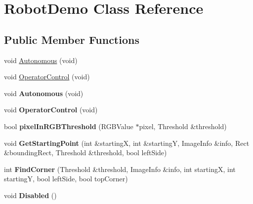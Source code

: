 \hypertarget{class_robot_demo}{\section{Robot\-Demo Class Reference}
\label{class_robot_demo}
}
\subsection*{Public Member Functions}
\begin{DoxyCompactItemize}
\item 
void \hyperlink{class_robot_demo_a80f9c6496e671ca2145d7f5543985e9a}{Autonomous} (void)
\item 
void \hyperlink{class_robot_demo_aea3d3a6789fa41653464bddc48d6a2c1}{Operator\-Control} (void)
\item 
\hypertarget{class_robot_demo_a80f9c6496e671ca2145d7f5543985e9a}{void {\bfseries Autonomous} (void)}\label{class_robot_demo_a80f9c6496e671ca2145d7f5543985e9a}

\item 
\hypertarget{class_robot_demo_aea3d3a6789fa41653464bddc48d6a2c1}{void {\bfseries Operator\-Control} (void)}\label{class_robot_demo_aea3d3a6789fa41653464bddc48d6a2c1}

\item 
\hypertarget{class_robot_demo_a6974abdcd125a7701b6227d7de3794ea}{bool {\bfseries pixel\-In\-R\-G\-B\-Threshold} (R\-G\-B\-Value $\ast$pixel, Threshold \&threshold)}\label{class_robot_demo_a6974abdcd125a7701b6227d7de3794ea}

\item 
\hypertarget{class_robot_demo_a39d5d27c5c76c0a5482b24650bf85fb4}{void {\bfseries Get\-Starting\-Point} (int \&starting\-X, int \&starting\-Y, Image\-Info \&info, Rect \&bounding\-Rect, Threshold \&threshold, bool left\-Side)}\label{class_robot_demo_a39d5d27c5c76c0a5482b24650bf85fb4}

\item 
\hypertarget{class_robot_demo_a7d420e946e4e7ff2e61bd1da01b129dc}{int {\bfseries Find\-Corner} (Threshold \&threshold, Image\-Info \&info, int starting\-X, int starting\-Y, bool left\-Side, bool top\-Corner)}\label{class_robot_demo_a7d420e946e4e7ff2e61bd1da01b129dc}

\item 
\hypertarget{class_robot_demo_a3b3c94e56982e70da6883c71d4cd5bb9}{void {\bfseries Disabled} ()}\label{class_robot_demo_a3b3c94e56982e70da6883c71d4cd5bb9}


\end{DoxyCompactItemize}
